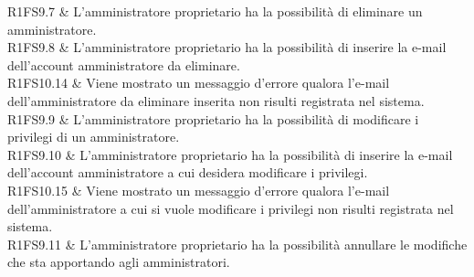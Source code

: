 R1FS9.7 & L'amministratore proprietario ha la possibilità di eliminare un amministratore. \\

R1FS9.8 & L'amministratore proprietario ha la possibilità di inserire la e-mail dell'account amministratore da eliminare. \\

R1FS10.14 & Viene mostrato un messaggio d'errore qualora l'e-mail dell'amministratore da eliminare inserita non risulti registrata nel sistema. \\

R1FS9.9 & L'amministratore proprietario ha la possibilità di modificare i privilegi di un amministratore. \\

R1FS9.10 & L'amministratore proprietario ha la possibilità di inserire la e-mail dell'account amministratore a cui desidera modificare i privilegi. \\

R1FS10.15 & Viene mostrato un messaggio d'errore qualora l'e-mail dell'amministratore a cui si vuole modificare i privilegi non risulti registrata nel sistema. \\

R1FS9.11 & L'amministratore proprietario ha la possibilità annullare le modifiche che sta apportando agli amministratori. \\

